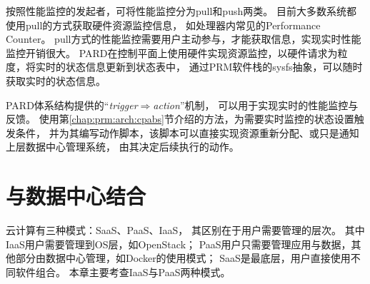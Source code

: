 按照性能监控的发起者，可将性能监控分为pull和push两类。
目前大多数系统都使用pull的方式获取硬件资源监控信息，
如处理器内常见的Performance Counter。
pull方式的性能监控需要用户主动参与，才能获取信息，实现实时性能监控开销很大。
PARD在控制平面上使用硬件实现资源监控，以硬件请求为粒度，将实时的状态信息更新到状态表中，
通过PRM软件栈的sysfs抽象，可以随时获取实时的状态信息。

PARD体系结构提供的``\emph{trigger$\Rightarrow$action}''机制，
可以用于实现实时的性能监控与反馈。
使用第\ref{chap:prm:arch:cpabs}节介绍的方法，为需要实时监控的状态设置触发条件，
并为其编写动作脚本，该脚本可以直接实现资源重新分配、或只是通知上层数据中心管理系统，
由其决定后续执行的动作。



\section{与数据中心结合}

云计算有三种模式：SaaS、PaaS、IaaS，%
其区别在于用户需要管理的层次。
其中IaaS用户需要管理到OS层，如OpenStack；
PaaS用户只需要管理应用与数据，其他部分由数据中心管理，如Docker的使用模式；
SaaS是最底层，用户直接使用不同软件组合。
本章主要考查IaaS与PaaS两种模式。


